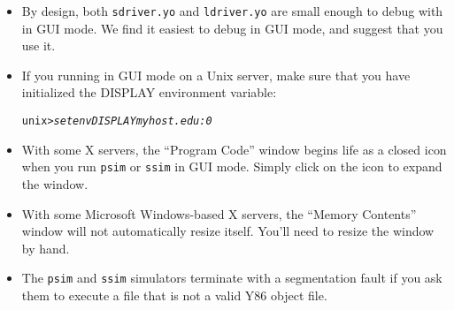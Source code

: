 \documentclass[11pt]{article}
\newenvironment{tty}%
{\small\begin{alltt}}%
{\end{alltt}}
\begin{document}
\begin{itemize}

\item By design, both \texttt{sdriver.yo} and \texttt{ldriver.yo}
are small enough to debug with in GUI mode. We find it
easiest to debug in GUI mode, and suggest that you use it.

\item If you running in GUI mode on a Unix server, make sure
that you have initialized the DISPLAY environment variable:
\begin{tty}
    unix> {\em setenv DISPLAY myhost.edu:0}
\end{tty}

\item With some X servers, the ``Program Code'' window begins life
as a closed icon when you run \texttt{psim} or \texttt{ssim} 
in GUI mode. Simply click on the icon to expand the window.

\item With some Microsoft 
Windows-based X servers, the ``Memory Contents'' window
will not automatically resize itself. You'll need to resize the window
by hand.

\item The \texttt{psim} and \texttt{ssim} simulators 
terminate with a segmentation fault if you ask them to execute a file
that is not a valid Y86 object file.

\end{itemize}
\end{document}
